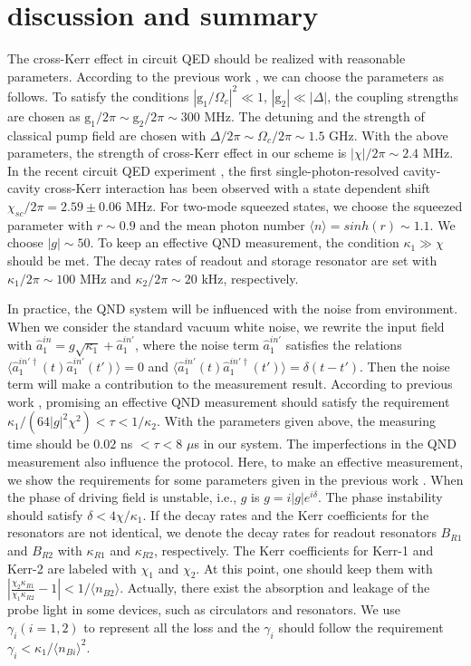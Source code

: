 \documentclass[preprintnumbers,showkeys,amsmath,amssymb]{revtex4}%
\begin{document}
\section{discussion and summary}\label{sec5}

The cross-Kerr effect in circuit QED should be realized with
reasonable parameters. According to the previous work \cite{YHu}, we
can choose the parameters as follows. To satisfy the conditions
$|\text{g}_{1}/\Omega_{c}|^{2}\ll 1$, $|\text{g}_{2}|\ll|\Delta|$,
the coupling strengths are chosen as
$\text{g}_{1}/2\pi\sim\text{g}_{2}/2\pi\sim 300$ MHz. The detuning
and the strength of classical pump field are chosen with
$\Delta/2\pi\sim\Omega_{c}/2\pi\sim 1.5$ GHz. With the above
parameters, the strength of cross-Kerr effect in our scheme is
$|\chi|/2\pi\sim 2.4$ MHz. In the recent circuit QED experiment \cite{ETHolland}, the first single-photon-resolved cavity-cavity cross-Kerr interaction has been observed with a state dependent shift $ \chi_{sc}/2\pi=2.59\pm0.06$ MHz.
For two-mode squeezed states, we choose
the squeezed parameter with $r\sim0.9$ and the mean photon number
$\langle n\rangle=sinh(r)\sim1.1$. We choose $|g|\sim50$. To keep an
effective QND measurement, the condition $\kappa_{1}\gg\chi$ should
be met. The decay rates of readout and storage resonator are set
with $\kappa_{1}/2\pi\sim 100$ MHz and $\kappa_{2}/2\pi\sim 20$ kHz,
respectively.



In practice, the QND system will be influenced with the noise from
environment. When we consider the standard vacuum white noise, we
rewrite the input field with
$\hat{a}^{in}_{1}\!=\!g\sqrt{\kappa_{1}}+\hat{a}^{in'}_{1}$, where
the noise term $\hat{a}^{in'}_{1}$ satisfies the relations
$\langle\hat{a}^{in'\dag}_{1}(t)\hat{a}^{in'}_{1}(t')\rangle=0$ and
$\langle\hat{a}^{in'}_{1}(t)\hat{a}^{in'\dag}_{1}(t')\rangle=\delta(t-t')$.
Then the noise term will make a contribution to the measurement
result. According to previous work \cite{LMDuanPRA2000}, promising
an effective QND measurement should satisfy the requirement
$\kappa_{1}/(64|g|^{2}\chi^{2})<\tau<1/\kappa_{2}$. With the
parameters given above, the measuring time should be $0.02$ ns
$<\tau<8$ $\mu$s in our system.
The imperfections in the QND measurement also influence the protocol. Here, to make an effective measurement, we show the requirements for some parameters given in the previous work \cite{LMDuanPRA2000}. When the phase of driving field is unstable, i.e., $g$ is $g=i|g|e^{i\delta}$. The phase instability should satisfy $\delta<4\chi/\kappa_{1}$. If the decay rates and the Kerr coefficients for the resonators are not identical, we denote the decay rates for readout resonators $B_{R1}$ and $B_{R2}$ with $\kappa_{R1}$ and $\kappa_{R2}$, respectively. The Kerr coefficients for Kerr-1 and Kerr-2 are labeled with $\chi_{1}$ and $\chi_{2}$. At this point, one should keep them with $|\frac{\chi_{2}\kappa_{R1}}{\chi_{1}\kappa_{R2}}-1|<1/\langle n_{B2}\rangle$. Actually, there exist the absorption and leakage of the probe light in some devices, such as circulators and resonators. We use $\gamma_{i}(i=1,2)$ to represent all the loss and the $\gamma_{i}$ should follow the requirement $\gamma_{i}<\kappa_{1}/\langle n_{Bi}\rangle^{2}$.
\end{document}
